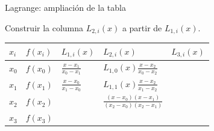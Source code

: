 \documentclass[original_version/main.tex]{subfiles}
\begin{document}
\begin{frame}[t]{Lagrange: ampliación de la tabla}
\par\noindent\begin{minipage}[t][10mm][t]{\textwidth}\small\strut Construir la columna $L_{2,i}(x)$ a partir de $L_{1,i}(x)$.\end{minipage}\par\nointerlineskip
\begin{minipage}[t]{\textwidth}\begingroup\scriptsize\setlength{\tabcolsep}{3pt}\begin{center}\begin{tabular}{|C{.065\textwidth}|C{.095\textwidth}|C{.19\textwidth}|C{.25\textwidth}|C{.25\textwidth}|}\hline
\rule[-2mm]{0pt}{6mm}$x_i$&$f(x_i)$&$L_{1,i}(x)$&$L_{2,i}(x)$&$L_{3,i}(x)$\\\hline
\rule[-2.5mm]{0pt}{8mm}$x_0$&$f(x_0)$&$\frac{x-x_1}{x_0-x_1}$&$L_{1,0}(x)\frac{x-x_2}{x_0-x_2}$&\\\hline
\rule[-2.5mm]{0pt}{8mm}$x_1$&$f(x_1)$&$\frac{x-x_0}{x_1-x_0}$&$L_{1,1}(x)\frac{x-x_2}{x_1-x_2}$&\\\hline
\rule[-2.5mm]{0pt}{8mm}$x_2$&$f(x_2)$&&$\frac{(x-x_0)(x-x_1)}{(x_2-x_0)(x_2-x_1)}$&\\\hline
\rule[-2.5mm]{0pt}{8mm}$x_3$&$f(x_3)$&&&\\\hline
\end{tabular}\end{center}\endgroup\par
\end{minipage}\par
\end{frame}
\end{document}
